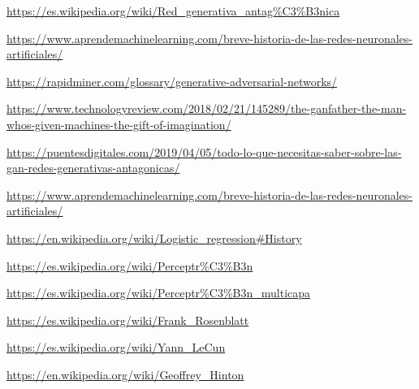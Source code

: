 \documentclass[a4paper]{article}
\begin{document}
\href{https://es.wikipedia.org/wiki/Red_generativa_antagónica}{https://es.wikipedia.org/wiki/Red\_generativa\_antag\%C3\%B3nica}

\url{https://www.aprendemachinelearning.com/breve-historia-de-las-redes-neuronales-artificiales/}

\url{https://rapidminer.com/glossary/generative-adversarial-networks/}

\url{https://www.technologyreview.com/2018/02/21/145289/the-ganfather-the-man-whos-given-machines-the-gift-of-imagination/}

\url{https://puentesdigitales.com/2019/04/05/todo-lo-que-necesitas-saber-sobre-las-gan-redes-generativas-antagonicas/}

\url{https://www.aprendemachinelearning.com/breve-historia-de-las-redes-neuronales-artificiales/}

\url{https://en.wikipedia.org/wiki/Logistic_regression#History}

\url{https://es.wikipedia.org/wiki/Perceptr\%C3\%B3n}

\url{https://es.wikipedia.org/wiki/Perceptr\%C3\%B3n_multicapa}

\url{https://es.wikipedia.org/wiki/Frank_Rosenblatt}

\url{https://es.wikipedia.org/wiki/Yann_LeCun}

\url{https://en.wikipedia.org/wiki/Geoffrey_Hinton}
\end{document}
